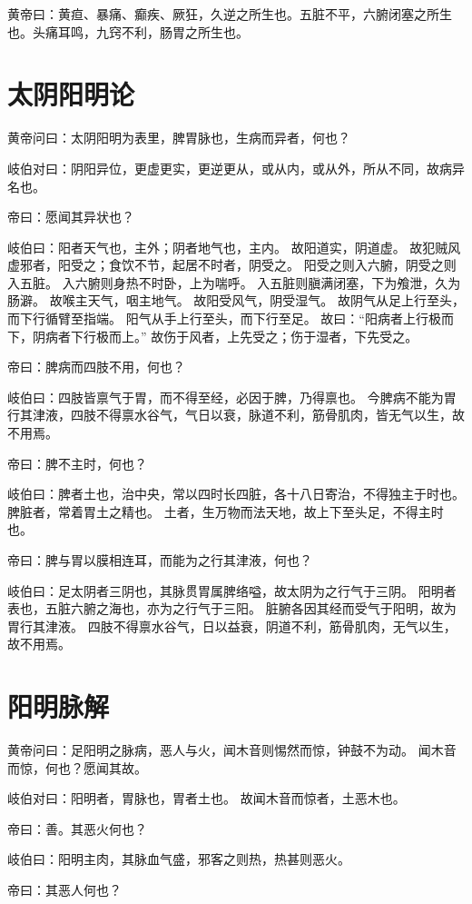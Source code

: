 \documentclass{article}%
\begin{document}
黄帝曰：黄疸、暴痛、癫疾、厥狂，久逆之所生也。五脏不平，六腑闭塞之所生也。头痛耳鸣，九窍不利，肠胃之所生也。


\section{太阴阳明论}
黄帝问曰：太阴阳明为表里，脾胃脉也，生病而异者，何也？

岐伯对曰：阴阳异位，更虚更实，更逆更从，或从内，或从外，所从不同，故病异名也。

帝曰：愿闻其异状也？

岐伯曰：阳者天气也，主外；阴者地气也，主内。
故阳道实，阴道虚。
故犯贼风虚邪者，阳受之；食饮不节，起居不时者，阴受之。
阳受之则入六腑，阴受之则入五脏。
入六腑则身热不时卧，上为喘呼。
入五脏则䐜满闭塞，下为飧泄，久为肠澼。
故喉主天气，咽主地气。
故阳受风气，阴受湿气。
故阴气从足上行至头，而下行循臂至指端。
阳气从手上行至头，而下行至足。
故曰：“阳病者上行极而下，阴病者下行极而上。”
故伤于风者，上先受之；伤于湿者，下先受之。

帝曰：脾病而四肢不用，何也？

岐伯曰：四肢皆禀气于胃，而不得至经，必因于脾，乃得禀也。
今脾病不能为胃行其津液，四肢不得禀水谷气，气日以衰，脉道不利，筋骨肌肉，皆无气以生，故不用焉。

帝曰：脾不主时，何也？

岐伯曰：脾者土也，治中央，常以四时长四脏，各十八日寄治，不得独主于时也。
脾脏者，常着胃土之精也。
土者，生万物而法天地，故上下至头足，不得主时也。

帝曰：脾与胃以膜相连耳，而能为之行其津液，何也？

岐伯曰：足太阴者三阴也，其脉贯胃属脾络嗌，故太阴为之行气于三阴。
阳明者表也，五脏六腑之海也，亦为之行气于三阳。
脏腑各因其经而受气于阳明，故为胃行其津液。
四肢不得禀水谷气，日以益衰，阴道不利，筋骨肌肉，无气以生，故不用焉。


\section{阳明脉解}
黄帝问曰：足阳明之脉病，恶人与火，闻木音则惕然而惊，钟鼓不为动。
闻木音而惊，何也？愿闻其故。

岐伯对曰：阳明者，胃脉也，胃者土也。
故闻木音而惊者，土恶木也。

帝曰：善。其恶火何也？

岐伯曰：阳明主肉，其脉血气盛，邪客之则热，热甚则恶火。

帝曰：其恶人何也？
\end{document}

